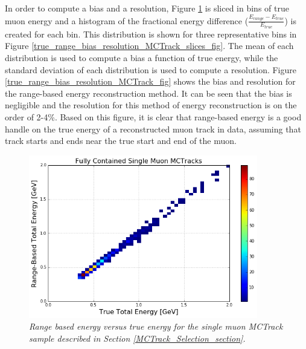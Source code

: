 In order to compute a bias and a resolution, Figure \ref{true_range_energy_MCTrack_fig} is sliced in bins of true muon energy and a histogram of the fractional energy difference ($\frac{E_{range} - E_{true}}{E_{true}}$) is created for each bin. This distribution is shown for three representative bins in Figure \ref{true_range_bias_resolution_MCTrack_slices_fig}. The mean of each distribution is used to compute a bias a function of true energy, while the standard deviation of each distribution is used to compute a resolution. Figure \ref{true_range_bias_resolution_MCTrack_fig} shows the bias and resolution for the range-based energy reconstruction method. It can be seen that the bias is negligible and the resolution for this method of energy reconstruction is on the order of 2-4\%. Based on this figure, it is clear that range-based energy is a good handle on the true energy of a reconstructed muon track in {\ub} data, assuming that track starts and ends near the true start and end of the muon.

\begin{figure}[h!]
\begin{center}
\includegraphics[width=100mm]{Figures/true_range_comparison_MCTracks.png}
\end{center}
\caption{\textit{Range based energy versus true energy for the single muon {\sc MCTrack} sample described in Section \ref{MCTrack_Selection_section}.}}
\label{true_range_energy_MCTrack_fig}
\end{figure}

